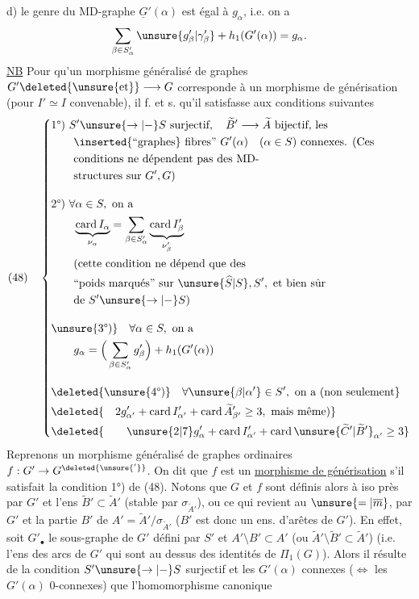 d) le genre du MD-graphe $\underline G'(\alpha)$ est égal à $g_\alpha$, i.e. on a
\[
\sum_{\beta\in S'_\alpha}\unsure{g'_\beta|\gamma'_\beta}+h_1(G'(\alpha))=g_\alpha.
\]
\uline{NB} Pour qu'un morphisme généralisé de graphes $G'\deleted{\unsure{\text{et}}}\longrightarrow G$ corresponde à un morphisme de générisation (pour $I'\simeq I$ convenable), il f. et s. qu'il satisfasse aux conditions suivantes
\[
(48)\quad\left\{\begin{aligned}
&\text{1°) }S'\unsure{\to|{-}}S\text{ surjectif},\quad\widetilde B'\longrightarrow\widetilde A\text{ bijectif, les}\\
&\qquad\inserted{\text{``graphes}}\text{ fibres'' }G'(\alpha)\quad(\alpha\in S)\text{ connexes. (Ces}\\
&\qquad\text{conditions ne dépendent pas des MD-}\\
&\qquad\text{structures sur }G',G\text{)}\\[1em]
&\text{2°) }\forall\alpha\in S,\text{ on a}\\
&\qquad\underbrace{\operatorname{card}I_\alpha}_{\nu_\alpha}=\sum_{\beta\in S'_\alpha}\underbrace{\operatorname{card}I'_\beta}_{\nu'_\beta}\\
&\qquad\text{(cette condition ne dépend que des}\\
&\qquad\text{``poids marqués'' sur }\unsure{\widehat S|S},S',\text{ et bien sûr}\\
&\qquad\text{de }S'\unsure{\to|{-}}S\text{)}\\[1em]
&\unsure{\text{3°)}}\quad\forall\alpha\in S,\text{ on a}\\
&\qquad g_\alpha=\Big(\sum_{\beta\in S'_\alpha}g'_\beta\Big)+h_1(G'(\alpha))\\[1em]
&\deleted{\unsure{\text{4°)}}\quad\forall\unsure{\beta|\alpha'}\in S',\text{ on a (non seulement}}\\
&\deleted{\quad2g'_{\alpha'}+\operatorname{card}I'_{\alpha'}+\operatorname{card}\widetilde A'_{\beta'}\geq3,\text{ mais même)}}\\
&\deleted{\qquad\unsure{2|7}g'_{\alpha}+\operatorname{card}I'_{\alpha'}+\operatorname{card}\unsure{\widetilde C'|\widetilde B'}_{\alpha'}\geq3}
\end{aligned}\right.
\]
Reprenons un morphisme généralisé de graphes ordinaires $f:G'\to G^{\deleted{\unsure{'}}}$. On dit que $f$ est un \uline{morphisme de générisation} s'il satisfait la condition 1°) de (48). Notons que $G$ et $f$ sont définis alors à iso près par $G'$ et l'ens $\widetilde B'\subset\widetilde A'$ (stable par $\sigma_{\widetilde A'}$), ou ce qui revient au $\unsure{=|\overline m}$, par $G'$ et la  partie $B'$ de $A'=\widetilde A'/\sigma_{\widetilde A'}$ ($B'$ est donc un ens. d'arêtes de $G'$). En effet, soit $G'_\bullet$ le sous-graphe de $G'$ défini par $S'$ et $A'\setminus B'\subset A'$ (ou $\widetilde A'\setminus\widetilde B'\subset\widetilde A'$) (i.e.  l'ens des  arcs de $G'$ qui sont au dessus des identités de $\Pi_1(G)$). Alors il résulte de la condition $S'\unsure{\to|{-}}S$ surjectif et les $G'(\alpha)$ connexes ($\Longleftrightarrow$ les $G'(\alpha)$ 0-connexes) que  l'homomorphisme canonique
